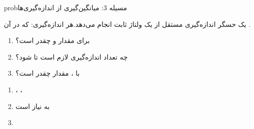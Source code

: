 \begin{PSbox}[unbreakable]{prob}{مسیله 3: میانگین‌گیری از اندازه‌گیری‌ها}

یک حسگر  اندازه‌گیری مستقل از یک ولتاژ ثابت  انجام می‌دهد.\PSbr{}هر اندازه‌گیری:  که در آن .

\begin{enumerate}
\def\labelenumi{(\PSalph{enumi})}
\tightlist
\item
  برای  مقدار  و  چقدر است؟
\item
  چه تعداد اندازه‌گیری  لازم است تا  شود؟
\item
  با ، مقدار  چقدر است؟
\end{enumerate}

\PSsolution{} 

\begin{enumerate}
\def\labelenumi{(\PSalph{enumi})}
\item
  ، ، 
\item
   به  نیاز است
\item
  \PSbr{}
\end{enumerate}

\end{PSbox}

